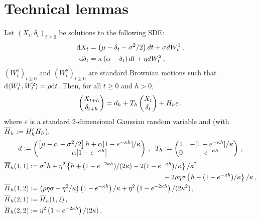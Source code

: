 \section{Technical lemmas}%
\begin{lemma}
\label{lem:integratedSDE}
Let $(X_t,\delta_t)_{t\ge0}$ be solutions to the following SDE:
\begin{align*}
\mathrm{d} X_t &= \left(\mu - \delta_t- \sigma^2/2 \right) dt + \sigma d W^1_t \,,\\
\mathrm{d} \delta_t &= \kappa\left( \alpha - \delta_t\right)dt + \eta dW^2_t \,,
\end{align*}
$(W_t^1)_{t\ge 0}$ and $(W_t^2)_{t\ge 0}$ are standard Brownian motions such that $\mathrm{d} \langle W_t^1,W_t^2 \rangle = \rho\mathrm{d} t$.
Then, for all $t\ge 0$ and $h>0$,
\[
\begin{pmatrix} X_{t+h} \\ \delta_{t+h}\end{pmatrix} = d_h + T_h\begin{pmatrix} X_{t} \\ \delta_{t}\end{pmatrix} + H_h\varepsilon\,,
\]
where $\varepsilon$ is a standard 2-dimensional Gaussian random variable and (with $\overline{H}_h:= H_h'H_h$),
\[
d :=
\begin{pmatrix} \left[\mu- \alpha - \sigma^2/2 \right] h + \alpha[1-e^{-\kappa h}]/\kappa\\
\alpha [1-e^{-\kappa h}] \end{pmatrix}\,, \;\; T_h :=
\begin{pmatrix} 1 & -[1-e^{-\kappa h}]/\kappa \\ 0 & e^{-\kappa h} \end{pmatrix} \,,
\]
\begin{align*}
\barH_h(1,1) & \eqdef \sigma^2 h+ \eta^2\left\{h + (1-e^{-2\kappa h})/(2\kappa) - 2(1-e^{-\kappa h})/\kappa  \right\}/\kappa^2 \\
&\hspace{7cm} -2\rho\eta\sigma\left\{h - (1-e^{-\kappa h})/\kappa \right\}/\kappa\eqsp, \\
\barH_h(1,2) & \eqdef \left(\rho \eta \sigma-\eta^2/\kappa\right)\left(1-e^{-\kappa h} \right)/\kappa + \eta^2\left(1-e^{-2\kappa h} \right)/(2\kappa^2)\eqsp,\\
\barH_h(2,1) & \eqdef \barH_h(1,2)\eqsp,\\
\barH_h(2,2) & \eqdef \eta^2\left( 1-e^{-2\kappa h} \right)/(2\kappa)\eqsp.
\end{align*}
\end{lemma}

